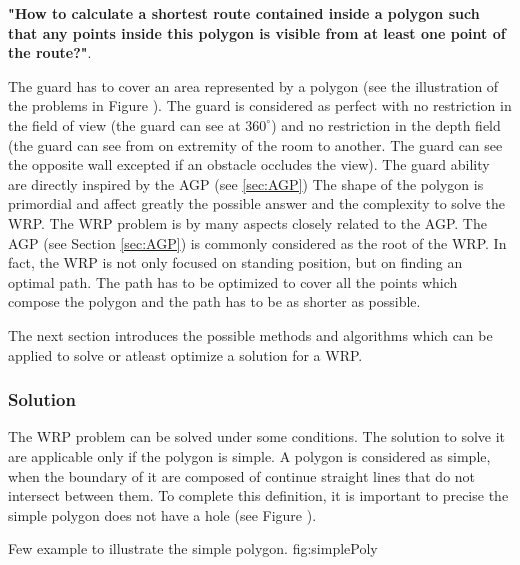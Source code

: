 \textbf{"How to calculate a shortest route contained inside a polygon such that any points inside this polygon is visible from at least one point of the route?"}.  

The guard has to cover an area represented by a polygon (see the illustration of the problems in Figure ). The guard is considered as perfect with no restriction in the field of view (the guard can see at $360^\circ$) and no restriction in the depth field (the guard can see from on extremity of the room to another. The guard can see the opposite wall excepted if an obstacle occludes the view). The guard ability are directly inspired by the AGP (see \ref{sec:AGP})
The shape of the polygon is primordial and affect greatly the possible answer and the complexity to solve the WRP.
The WRP problem is by many aspects closely related to the AGP. The AGP (see Section \ref{sec:AGP}) is commonly considered as the root of the WRP.
 In fact, the WRP is not only focused on standing position, but on finding an optimal path. The path has to be optimized to cover all the points which compose the polygon  and the path has to be as shorter as possible.
 
 The next section introduces the possible methods and algorithms which can be applied to solve or atleast optimize a solution for a WRP.
 



 
\subsubsection{Solution} 

The WRP problem can be solved under some conditions. The solution to solve it are applicable only if the polygon is simple. A polygon is considered as simple, when the boundary of it are composed of continue straight lines that do not intersect between them. To complete this definition, it is important to precise the simple polygon does not have a hole (see Figure ). 
 \begin{mfigures}[!]
{Few example to illustrate the simple polygon. }{fig:simplePoly} \centering
{}
\hspace{1cm}
\hspace{1cm}
\end{mfigures}	


